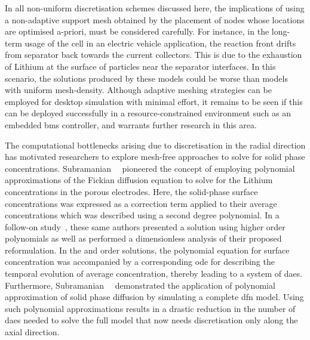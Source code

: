 In all  non-uniform discretisation schemes  discussed here, the  implications of
using  a non-adaptive  support mesh  obtained by  the placement  of nodes  whose
locations are optimised a-priori, must be considered carefully. For instance, in
the long-term  usage of the cell  \eg{} in an electric  vehicle application, the
reaction  front  drifts from  separator  back  towards the  current  collectors.
This  is  due  to  the  exhaustion  of  Lithium  at  the  surface  of  particles
near  the separator  interfaces. In  this  scenario, the  solutions produced  by
these  models could  be worse  than models  with uniform  mesh-density. Although
adaptive meshing strategies can be  employed for desktop simulation with minimal
effort,  it remains  to  be seen  if  this  can be  deployed  successfully in  a
resource-constrained environment  such as an embedded  \gls{bms} controller, and
warrants  further  research in  this  area.


The  computational  bottlenecks arising  due  to  discretisation in  the  radial
direction has motivated researchers to explore mesh-free approaches to solve for
solid  phase concentrations.  Subramanian~\etal~\cite{Subramanian2004} pioneered
the  concept of  employing polynomial  approximations of  the Fickian  diffusion
equation to solve for the Lithium concentrations in the porous electrodes. Here,
the  solid-phase  surface concentrations  was  expressed  as a  correction  term
applied  to their  average concentrations  which  was described  using a  second
degree  polynomial.  In  a follow-on  study~\cite{Subramanian2005},  these  same
authors  presented  a  solution  using  higher  order  polynomials  as  well  as
performed  a dimensionless  analysis  of their  proposed  reformulation. In  the
 and   order solutions, the  polynomial equation
for  surface concentration  was  accompanied by  a  corresponding \gls{ode}  for
describing the temporal evolution of average concentration, thereby leading to a
system  of  \gls{dae}s. Furthermore,  Subramanian~\etal{}~\cite{Subramanian2007}
demonstrated  the  application  of   polynomial  approximation  of  solid  phase
diffusion  by  simulating a  complete  \gls{dfn}  model. Using  such  polynomial
approximations results in a drastic reduction in the number of \gls{dae}s needed
to  solve the  full model  that now  needs discretisation  only along  the axial
direction.


